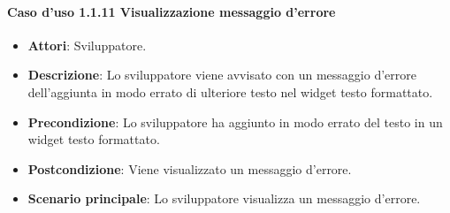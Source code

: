 \paragraph{Caso d'uso 1.1.11 Visualizzazione messaggio d'errore}
\begin{itemize}
\item\textbf{Attori}: Sviluppatore.
\item\textbf{Descrizione}: Lo sviluppatore viene avvisato con un messaggio d'errore dell'aggiunta in modo errato di ulteriore testo nel widget testo formattato.
\item\textbf{Precondizione}: Lo sviluppatore ha aggiunto in modo errato del testo in un widget testo formattato.
\item\textbf{Postcondizione}: Viene visualizzato un messaggio d'errore.
\item\textbf{Scenario principale}: Lo sviluppatore visualizza un messaggio d'errore.
\end{itemize}